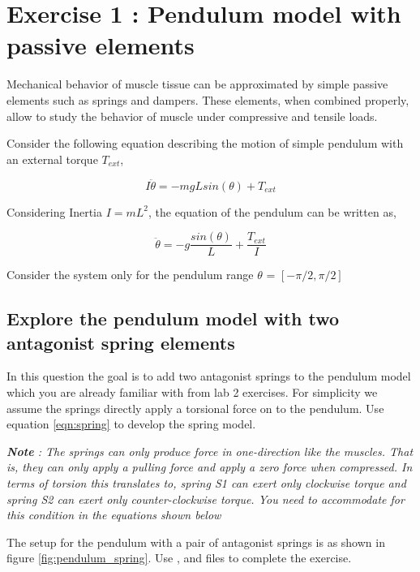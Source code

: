 \documentclass{cmc}
\begin{document}
\section*{Exercise 1 : Pendulum model with passive elements}
\label{sec:question-1}

Mechanical behavior of muscle tissue can be approximated by simple
passive elements such as springs and dampers. These elements, when
combined properly, allow to study the behavior of muscle under
compressive and tensile loads.

Consider the following equation describing the motion of simple
pendulum with an external torque $T_{ext}$,

\begin{equation}
  \label{eq:pendulum_1}
  I\ddot{\theta} = -mgLsin(\theta) + T_{ext}
\end{equation}

Considering Inertia $I = mL^2$, the equation of the pendulum can be
written as,

\begin{equation}
  \label{eq:pendulum}
  \ddot{\theta} = -g\frac{sin(\theta)}{L} + \frac{T_{ext}}{I}
\end{equation}

Consider the system only for the pendulum range $\theta$ =
$[-\pi/2, \pi/2]$

\subsection*{Explore the pendulum model with two antagonist spring
  elements}

In this question the goal is to add two antagonist springs to the
pendulum model which you are already familiar with from lab 2
exercises. For simplicity we assume the springs directly apply a
torsional force on to the pendulum.  Use equation \ref{eqn:spring} to
develop the spring model.

\textit{\textbf{Note} : The springs can only produce force in
  one-direction like the muscles.  That is, they can only apply a
  pulling force and apply a zero force when compressed.  In terms of
  torsion this translates to, spring S1 can exert only clockwise
  torque and spring S2 can exert only counter-clockwise torque.  You
  need to accommodate for this condition in the equations shown below}

The setup for the pendulum with a pair of antagonist springs is as
shown in figure \ref{fig:pendulum_spring}. Use ,
 and  files to
complete the exercise.
\end{document}
